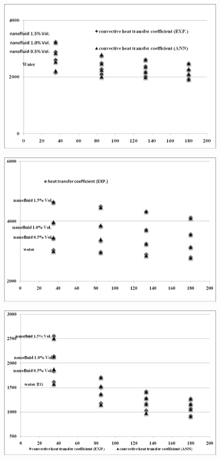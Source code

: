 \documentclass{article}
\begin{document}
\begin{figure}
	\centering
	\includegraphics[width=0.9\linewidth]{fig4}
	\caption{}
	\label{fig:fig4}
\end{figure}

\begin{figure}
	\centering
	\includegraphics[width=0.7\linewidth]{fig5}
	\caption{}
	\label{fig:fig5}
\end{figure}

\begin{figure}
	\centering
	\includegraphics[width=0.8\linewidth]{fig8}
	\caption{}
	\label{fig:fig8}
\end{figure}
\end{document}
